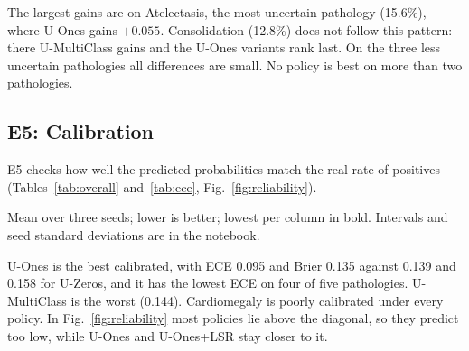 \documentclass[conference]{IEEEtran}
\begin{document}
The largest gains are on Atelectasis, the most uncertain pathology (15.6\%), where U-Ones gains $+0.055$. Consolidation (12.8\%) does not follow this pattern: there U-MultiClass gains and the U-Ones variants rank last. On the three less uncertain pathologies all differences are small. No policy is best on more than two pathologies.

\subsection{E5: Calibration}

E5 checks how well the predicted probabilities match the real rate of positives (Tables~\ref{tab:overall} and~\ref{tab:ece}, Fig.~\ref{fig:reliability}).

\begin{table}[!t]
\centering
\caption{Test ECE per Pathology (E5)}
\label{tab:ece}
\footnotesize
{}
\par\smallskip
\parbox{\columnwidth}{\footnotesize Mean over three seeds; lower is better; lowest per column in bold. Intervals and seed standard deviations are in the notebook.}
\end{table}

U-Ones is the best calibrated, with ECE 0.095 and Brier 0.135 against 0.139 and 0.158 for U-Zeros, and it has the lowest ECE on four of five pathologies. U-MultiClass is the worst (0.144). Cardiomegaly is poorly calibrated under every policy. In Fig.~\ref{fig:reliability} most policies lie above the diagonal, so they predict too low, while U-Ones and U-Ones+LSR stay closer to it.
\end{document}
